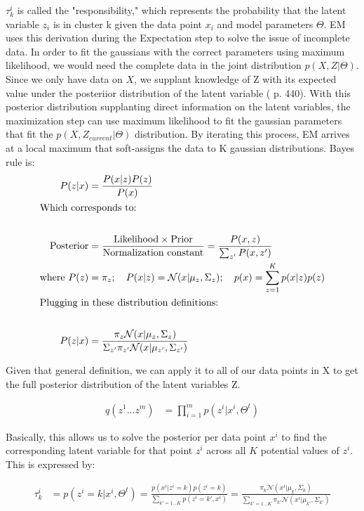 \documentclass[twoside,12pt]{article}
\begin{document}
\begin{enumerate}[label*=\arabic*.]
$\tau_k^i$ is called the "responsibility," which represents the probability that the latent variable $z_i$ is in cluster k given the data point $x_i$ and model parameters $\Theta$. EM uses this derivation during the Expectation step to solve the issue of incomplete data. In order to fit the gaussians with the correct parameters using maximum likelihood, we would need the complete data in the joint distribution $p(X,Z|\Theta)$. Since we only have data on $X$, we supplant knowledge of Z with its expected value under the posteriior distribution of the latent variable (\cite{bishop2007} p. 440). With this posterior distribution supplanting direct information on the latent variables, the maximization step can use maximum likelihood to fit the gaussian parameters that fit the $p(X, Z_{current} | \Theta)$ distribution. By iterating this process, EM arrives at a local maximum that soft-assigns the data to K gaussian distributions. 
Bayes rule is:
\begin{align*}
P(z|x) &= \frac{P(x|z)P(z)}{P(x)} \\
\intertext{Which corresponds to:} \\
\text{Posterior} &= \frac{\text{Likelihood} \times \text{Prior}}{\text{Normalization constant}} = \frac{P(x,z)}{\sum_{z'}P(x,z')} \\
\text{where } P(z) &= \pi_z ; \quad P(x|z)=\mathcal{N}(x|\mu_z,\Sigma_z); \quad p(x) = \sum_{z=1}^K p(x|z)p(z)\\
\intertext{Plugging in these distribution definitions:} \\
P(z|x) &= \frac{\pi_z \mathcal{N}(x|\mu_z,\Sigma_z)}{\Sigma_{z'}\pi_{z'}\mathcal{N}(x|\mu_{z'},\Sigma_{z'})}
\end{align*}

Given that general definition, we can apply it to all of our data points in X to get the full posterior distribution of the latent variables Z.

\begin{align*}
q(z^1...z^m) &= \prod_{i=1}^m p(z^i | x^i, \Theta^t)
\end{align*}

Basically, this allows us to solve the posterior per data point $x^i$ to find the corresponding latent variable for that point $z^i$ across all $K$ potential values of $z^i$. This is expressed by:

\begin{align*}
\tau_k^i &= p(z^i = k|x^i,\Theta^t) = \frac{p(x^i|z^i = k)p(z^i=k)}{\sum_{k'=1...K}p(z^i=k', x^i)} = \frac{\pi_k \mathcal{N}(x^i|\mu_k,\Sigma_k)}{\sum_{k'=1...K}\pi_{k'} \mathcal{N}(x^i|\mu_{k'},\Sigma_{k'})}
\end{align*}


\end{enumerate}
\end{document}
